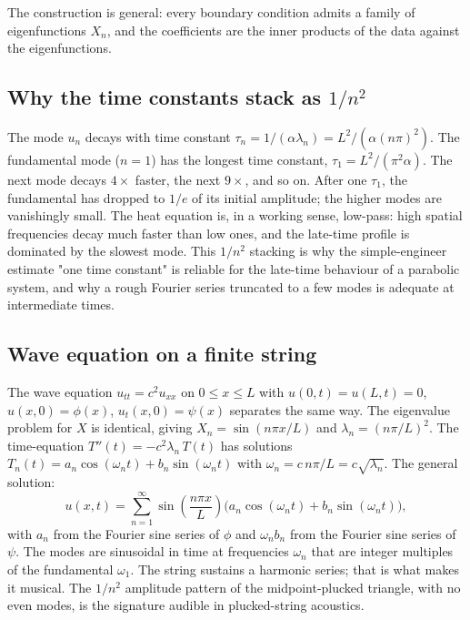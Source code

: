 The construction is general: every boundary condition admits a
family of eigenfunctions $X_{n}$, and the coefficients are the
inner products of the data against the eigenfunctions.



\subsection{Why the time constants stack as $1/n^{2}$}

The mode $u_{n}$ decays with time constant $\tau_{n} = 1/(\alpha
\lambda_{n}) = L^{2}/(\alpha (n \pi)^{2})$. The fundamental mode
($n = 1$) has the longest time constant, $\tau_{1} = L^{2}/(\pi^{2}
\alpha)$. The next mode decays $4\times$ faster, the next $9\times$,
and so on. After one $\tau_{1}$, the fundamental has dropped to
$1/e$ of its initial amplitude; the higher modes are vanishingly
small. The heat equation is, in a working sense, low-pass: high
spatial frequencies decay much faster than low ones, and the
late-time profile is dominated by the slowest mode. This
$1/n^{2}$ stacking is why the simple-engineer estimate "one time
constant" is reliable for the late-time behaviour of a parabolic
system, and why a rough Fourier series truncated to a few modes
is adequate at intermediate times.

\subsection{Wave equation on a finite string}

The wave equation $u_{tt} = c^{2} u_{xx}$ on $0 \leq x \leq L$
with $u(0, t) = u(L, t) = 0$, $u(x, 0) = \phi(x)$, $u_{t}(x, 0) =
\psi(x)$ separates the same way. The eigenvalue problem for $X$
is identical, giving $X_{n} = \sin(n \pi x/L)$ and $\lambda_{n} =
(n \pi/L)^{2}$. The time-equation $T''(t) = -c^{2} \lambda_{n}\,
T(t)$ has solutions $T_{n}(t) = a_{n} \cos(\omega_{n} t) + b_{n}
\sin(\omega_{n} t)$ with $\omega_{n} = c\, n \pi/L = c \sqrt
{\lambda_{n}}$. The general solution:
\[
u(x, t) = \sum_{n = 1}^{\infty} \sin\!\left(\frac{n \pi x}{L}\right) \bigl(a_{n} \cos(\omega_{n} t) + b_{n} \sin(\omega_{n} t)\bigr),
\]
with $a_{n}$ from the Fourier sine series of $\phi$ and
$\omega_{n} b_{n}$ from the Fourier sine series of $\psi$. The
modes are sinusoidal in time at frequencies $\omega_{n}$ that are
integer multiples of the fundamental $\omega_{1}$. The string
sustains a harmonic series; that is what makes it musical. The
$1/n^{2}$ amplitude pattern of the midpoint-plucked triangle, with
no even modes, is the signature audible in plucked-string acoustics.

